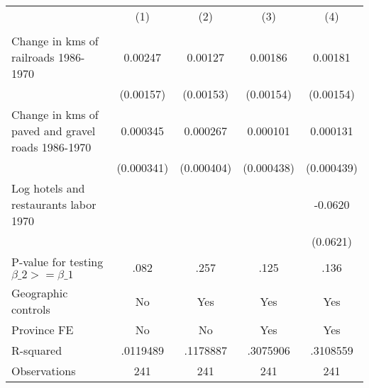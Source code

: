 {
\def\sym#1{\ifmmode^{#1}\else\(^{#1}\)\fi}
\begin{tabular}{l*{4}{c}}
\hline\hline
                &\multicolumn{1}{c}{(1)}&\multicolumn{1}{c}{(2)}&\multicolumn{1}{c}{(3)}&\multicolumn{1}{c}{(4)}\\
                &\multicolumn{1}{c}{}&\multicolumn{1}{c}{}&\multicolumn{1}{c}{}&\multicolumn{1}{c}{}\\
\hline
Change in kms of railroads 1986-1970&  0.00247         &  0.00127         &  0.00186         &  0.00181         \\
                &(0.00157)         &(0.00153)         &(0.00154)         &(0.00154)         \\
[1em]
Change in kms of paved and gravel roads 1986-1970& 0.000345         & 0.000267         & 0.000101         & 0.000131         \\
                &(0.000341)         &(0.000404)         &(0.000438)         &(0.000439)         \\
[1em]
Log hotels and restaurants labor 1970&                  &                  &                  &  -0.0620         \\
                &                  &                  &                  & (0.0621)         \\
\hline
P-value for testing $\beta\_{2} >= \beta\_{1}$&     .082         &     .257         &     .125         &     .136         \\
Geographic controls&       No         &      Yes         &      Yes         &      Yes         \\
Province FE     &       No         &       No         &      Yes         &      Yes         \\
R-squared       & .0119489         & .1178887         & .3075906         & .3108559         \\
Observations    &      241         &      241         &      241         &      241         \\
\hline\hline
\end{tabular}
}
